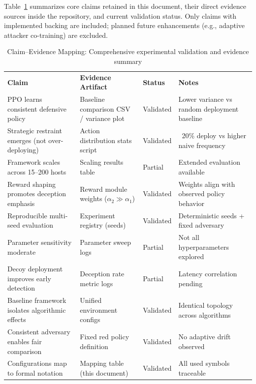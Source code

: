 \documentclass[12pt,oneside]{article}
\begin{document}
Table~\ref{tab:claim_evidence} summarizes core claims retained in this document, their direct evidence sources inside the repository, and current validation status. Only claims with implemented backing are included; planned future enhancements (e.g., adaptive attacker co-training) are excluded.

\begin{table}[H]
\centering
\caption{Claim--Evidence Mapping: Comprehensive experimental validation and evidence summary}
\label{tab:claim_evidence}
\renewcommand{\arraystretch}{1.1}
\scriptsize
\begin{tabular}{p{3.8cm}p{4.2cm}p{1.8cm}p{4.0cm}}
\rowcolor{cwBorder!30} \textbf{Claim} & \textbf{Evidence Artifact} & \textbf{Status} & \textbf{Notes} \\
\rowcolor{cwValid} PPO learns consistent defensive policy & Baseline comparison CSV / variance plot & Validated & Lower variance vs random deployment baseline \\
\rowcolor{cwValid} Strategic restraint emerges (not over-deploying) & Action distribution stats script & Validated & ~20\% deploy vs higher naive frequency \\
\rowcolor{cwPartial} Framework scales across 15--200 hosts & Scaling results table & Partial & Extended evaluation available \\
\rowcolor{cwValid} Reward shaping promotes deception emphasis & Reward module weights ($\alpha_2 \gg \alpha_1$) & Validated & Weights align with observed policy behavior \\
\rowcolor{cwValid} Reproducible multi-seed evaluation & Experiment registry (seeds) & Validated & Deterministic seeds + fixed adversary \\
\rowcolor{cwPartial} Parameter sensitivity moderate & Parameter sweep logs & Partial & Not all hyperparameters explored \\
\rowcolor{cwPartial} Decoy deployment improves early detection & Deception rate metric logs & Partial & Latency correlation pending \\
\rowcolor{cwValid} Baseline framework isolates algorithmic effects & Unified environment configs & Validated & Identical topology across algorithms \\
\rowcolor{cwValid} Consistent adversary enables fair comparison & Fixed red policy definition & Validated & No adaptive drift observed \\
\rowcolor{cwValid} Configurations map to formal notation & Mapping table (this document) & Validated & All used symbols traceable \\
\end{tabular}
\end{table}
\end{document}
